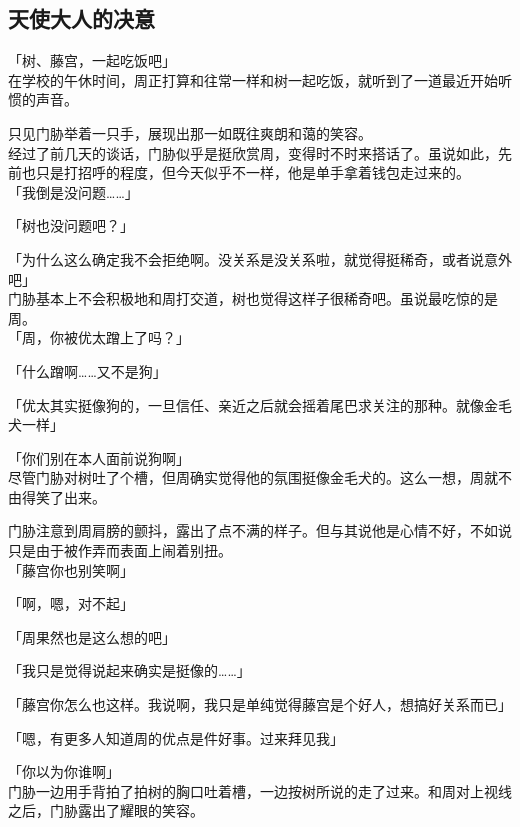 \subsection{天使大人的决意}

「树、藤宫，一起吃饭吧」\\

在学校的午休时间，周正打算和往常一样和树一起吃饭，就听到了一道最近开始听惯的声音。

只见门胁举着一只手，展现出那一如既往爽朗和蔼的笑容。\\

经过了前几天的谈话，门胁似乎是挺欣赏周，变得时不时来搭话了。虽说如此，先前也只是打招呼的程度，但今天似乎不一样，他是单手拿着钱包走过来的。\\

「我倒是没问题……」

「树也没问题吧？」

「为什么这么确定我不会拒绝啊。没关系是没关系啦，就觉得挺稀奇，或者说意外吧」\\

门胁基本上不会积极地和周打交道，树也觉得这样子很稀奇吧。虽说最吃惊的是周。\\

「周，你被优太蹭上了吗？」

「什么蹭啊……又不是狗」

「优太其实挺像狗的，一旦信任、亲近之后就会摇着尾巴求关注的那种。就像金毛犬一样」

「你们别在本人面前说狗啊」\\

尽管门胁对树吐了个槽，但周确实觉得他的氛围挺像金毛犬的。这么一想，周就不由得笑了出来。

门胁注意到周肩膀的颤抖，露出了点不满的样子。但与其说他是心情不好，不如说只是由于被作弄而表面上闹着别扭。\\

「藤宫你也别笑啊」

「啊，嗯，对不起」

「周果然也是这么想的吧」

「我只是觉得说起来确实是挺像的……」

「藤宫你怎么也这样。我说啊，我只是单纯觉得藤宫是个好人，想搞好关系而已」

「嗯，有更多人知道周的优点是件好事。过来拜见我」

「你以为你谁啊」\\

门胁一边用手背拍了拍树的胸口吐着槽，一边按树所说的走了过来。和周对上视线之后，门胁露出了耀眼的笑容。

